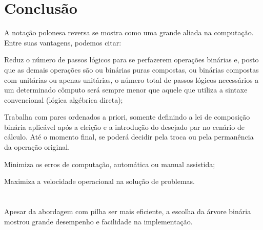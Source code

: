 \documentclass{article}
\begin{document}
\section{Conclusão}

\begin{list_type}
\item
A notação polonesa reversa se mostra como uma grande aliada na computação. Entre suas vantagens, podemos citar:
\\
    \item Reduz o número de passos lógicos para se perfazerem operações binárias e, posto que as demais operações são ou binárias puras compostas, ou binárias compostas com unitárias ou apenas unitárias, o número total de passos lógicos necessários a um determinado cômputo será sempre menor que aquele que utiliza a sintaxe convencional (lógica algébrica direta);    \citep{adams1995hitchhiker}

    \item Trabalha com pares ordenados a priori, somente definindo a lei de composição binária aplicável após a eleição e a introdução do desejado par no cenário de cálculo. Até o momento final, se poderá decidir pela troca ou pela permanência da operação original.   \citep{adams1995hitchhiker}

    \item Minimiza os erros de computação, automática ou manual assistida;   \citep{adams1995hitchhiker}

    \item Maximiza a velocidade operacional na solução de problemas.   \citep{adams1995hitchhiker}
\\
\\
\\
Apesar da abordagem com pilha ser mais eficiente, a escolha da árvore binária mostrou grande desempenho e facilidade na implementação.
\end{list_type}






\end{document}
